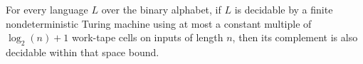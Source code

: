 \begin{theorem}
\label{Complexity.compl_mem_NL}
\leanok
{}
For every language $L$ over the binary alphabet, if $L$ is decidable by a finite
nondeterministic Turing machine using at most a constant multiple of $\log_2(n)+1$
work-tape cells on inputs of length $n$, then its complement is also decidable within
that space bound.
\end{theorem}
